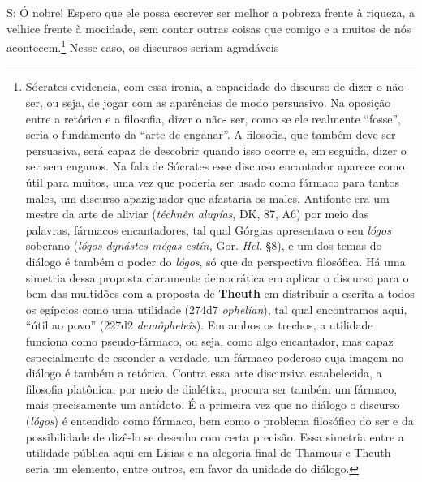 S: Ó nobre! Espero que ele possa escrever ser melhor a pobreza frente à
riqueza, a velhice frente à mocidade, sem contar outras coisas que
comigo e a muitos de nós acontecem.\footnote{Sócrates evidencia, com
  essa ironia, a capacidade do discurso de dizer o não-ser, ou seja, de
  jogar com as aparências de modo persuasivo. Na oposição entre a
  retórica e a filosofia, dizer o não- ser, como se ele realmente
  ``fosse'', seria o fundamento da ``arte de enganar''. A filosofia, que
  também deve ser persuasiva, será capaz de descobrir quando isso ocorre
  e, em seguida, dizer o ser sem enganos. Na fala de Sócrates esse
  discurso encantador aparece como útil para muitos, uma vez que poderia
  ser usado como fármaco para tantos males, um discurso apaziguador que
  afastaria os males. Antifonte era um mestre da arte de aliviar
  (\emph{téchnên alupías}, DK, 87, A6) por meio das palavras, fármacos
  encantadores, tal qual Górgias apresentava o seu \emph{lógos} soberano
  (\emph{lógos dynástes mégas estín,} Gor. \emph{Hel}. §8), e um dos
  temas do diálogo é também o poder do \emph{lógos}, só que da
  perspectiva filosófica. Há uma simetria dessa proposta claramente
  democrática em aplicar o discurso para o bem das multidões com a
  proposta de \textbf{Theuth} em distribuir a escrita a todos os
  egípcios como uma utilidade (274d7 \emph{ophelían}), tal qual
  encontramos aqui, ``útil ao povo'' (227d2 \emph{demôpheleîs}). Em
  ambos os trechos, a utilidade funciona como pseudo-fármaco, ou seja,
  como algo encantador, mas capaz especialmente de esconder a verdade,
  um fármaco poderoso cuja imagem no diálogo é também a retórica. Contra
  essa arte discursiva estabelecida, a filosofia platônica, por meio de
  dialética, procura ser também um fármaco, mais precisamente um
  antídoto. É a primeira vez que no diálogo o discurso (\emph{lógos}) é
  entendido como fármaco, bem como o problema filosófico do ser e da
  possibilidade de dizê-lo se desenha com certa precisão. Essa simetria
  entre a utilidade pública aqui em Lísias e na alegoria final de
  Thamous e Theuth seria um elemento, entre outros, em favor da unidade
  do diálogo.} Nesse caso, os discursos seriam agradáveis
